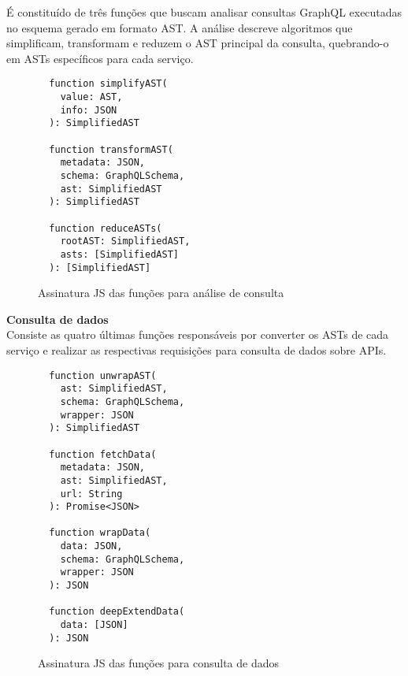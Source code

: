 É constituído de três funções que buscam analisar consultas GraphQL executadas no esquema gerado em formato AST. A análise descreve algoritmos que simplificam, transformam e reduzem o AST principal da consulta, quebrando-o em ASTs específicos para cada serviço.

\begin{figure}[H]
  \centering
  \begin{verbatim}
  function simplifyAST(
    value: AST,
    info: JSON
  ): SimplifiedAST

  function transformAST(
    metadata: JSON,
    schema: GraphQLSchema,
    ast: SimplifiedAST
  ): SimplifiedAST

  function reduceASTs(
    rootAST: SimplifiedAST,
    asts: [SimplifiedAST]
  ): [SimplifiedAST]
  \end{verbatim}
  \caption{Assinatura JS das funções para análise de consulta}
\end{figure}

\textbf{Consulta de dados} \\

Consiste as quatro últimas funções responsáveis por converter os ASTs de cada serviço e realizar as respectivas requisições para consulta de dados sobre APIs.

\begin{figure}[H]
  \centering
  \begin{verbatim}
  function unwrapAST(
    ast: SimplifiedAST,
    schema: GraphQLSchema,
    wrapper: JSON
  ): SimplifiedAST

  function fetchData(
    metadata: JSON,
    ast: SimplifiedAST,
    url: String
  ): Promise<JSON>

  function wrapData(
    data: JSON,
    schema: GraphQLSchema,
    wrapper: JSON
  ): JSON

  function deepExtendData(
    data: [JSON]
  ): JSON
  \end{verbatim}
  \caption{Assinatura JS das funções para consulta de dados}
\end{figure}
